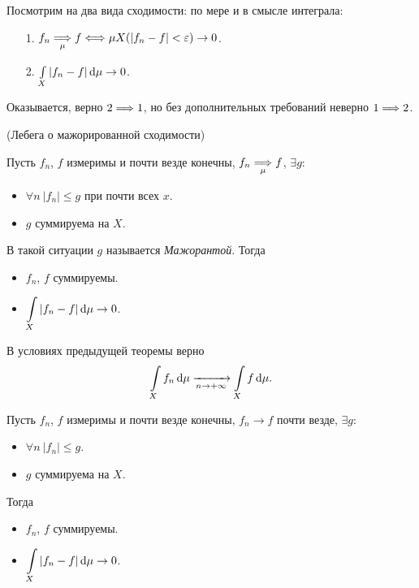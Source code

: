 \begin{remark}
    Посмотрим на два вида сходимости: по мере и в смысле интеграла:
    \begin{itemize}
        \item[1.] $f_n \underset{\mu}{\Longrightarrow} f \Longleftrightarrow \mu X(|f_n - f| < \varepsilon) \to 0$.
        \item[2.] $\int\limits_{X}{|f_n - f| \,\mathrm{d}\mu} \to 0$.
    \end{itemize} 
    Оказывается, верно $2 \Longrightarrow 1$, но без дополнительных требований неверно $1 \Longrightarrow 2$.
\end{remark}

\begin{theorem}(Лебега о мажорированной сходимости)
    
    Пусть $f_n$, $f$ измеримы и почти везде конечны, $f_n \underset{\mu}{\Longrightarrow} f$, 
    $\exists g\colon~$
    \begin{itemize}
        \item $\forall n~ |f_n| \leqslant g$ при почти всех $x$.
        \item $g$ суммируема на $X$.
    \end{itemize} 
    В такой ситуации $g$ называется \textit{Мажорантой}. Тогда
    \begin{itemize}
        \item $f_n$, $f$ суммируемы.
        \item $\displaystyle \int\limits_{X}{|f_n - f| \,\mathrm{d}\mu} \to 0$.
    \end{itemize} 
\end{theorem}

\begin{corollary}
    
    В условиях предыдущей теоремы верно
\[
    \int\limits_{X}{f_n \,\mathrm{d}\mu} \xrightarrow[n \to +\infty]{} \int\limits_{X}{f \,\mathrm{d}\mu}
.\] 
\end{corollary}

\begin{theorem}
    Пусть $f_n$, $f$ измеримы и почти везде конечны, $f_n \to f$ почти везде,
    $\exists g\colon~$
    \begin{itemize}
        \item $\forall n~ |f_n| \leqslant g$.
        \item $g$ суммируема на $X$.
    \end{itemize}
    Тогда
    \begin{itemize}
        \item $f_n$, $f$ суммируемы.
        \item $\displaystyle \int\limits_{X}{|f_n - f| \,\mathrm{d}\mu} \to 0$.
    \end{itemize} 
\end{theorem}

